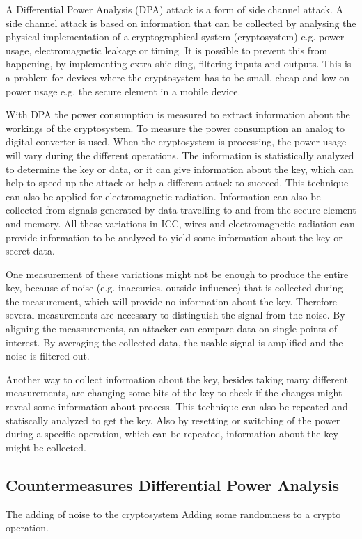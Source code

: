 A Differential Power Analysis (DPA) attack is a form of side channel attack. A side channel attack is based on information that can be collected by analysing the physical implementation of a cryptographical system (cryptosystem) e.g. power usage, electromagnetic leakage or timing. It is possible to prevent this from happening, by implementing extra shielding, filtering inputs and outputs. This is a problem for devices where the cryptosystem has to be small, cheap and low on power usage e.g. the secure element in a mobile device.

With DPA the power consumption is measured to extract information about the workings of the cryptosystem. To measure the power consumption an analog to digital converter is used. When the cryptosystem is processing, the power usage will vary during the different operations. The information is statistically analyzed to determine the key or data, or it can give information about the key, which can help to speed up the attack or help a different attack to succeed. This technique can also be applied for electromagnetic radiation. Information can also be collected from signals generated by data travelling to and from the secure element and memory.
All these variations in ICC, wires and electromagnetic radiation can provide information to be analyzed to yield some information about the key or secret data.

One measurement of these variations might not be enough to produce the entire key, because of noise (e.g. inaccuries, outside influence) that is collected during the measurement, which will provide no information about the key. Therefore several measurements are necessary to distinguish the signal from the noise. By aligning the meassurements, an attacker can compare data on single points of interest. By averaging the collected data, the usable signal is amplified and the noise is filtered out.

Another way to collect information about the key, besides taking many different measurements, are changing some bits of the key to check if the changes might reveal some information about process. This technique can also be repeated and statiscally analyzed to get the key. Also by resetting or switching of the power during a specific operation, which can be repeated, information about the key might be collected.




\subsection{Countermeasures Differential Power Analysis}

The adding of noise to the cryptosystem
Adding some randomness to a crypto operation.


